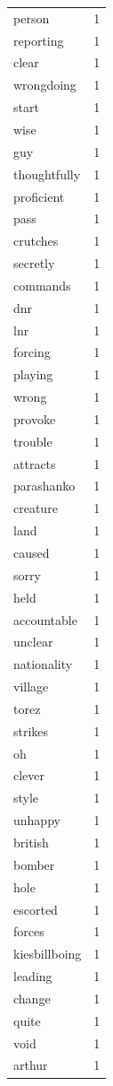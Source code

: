 \begin{tabular}{lr}
person & 1 \\
reporting & 1 \\
clear & 1 \\
wrongdoing & 1 \\
start & 1 \\
wise & 1 \\
guy & 1 \\
thoughtfully & 1 \\
proficient & 1 \\
pass & 1 \\
crutches & 1 \\
secretly & 1 \\
commands & 1 \\
dnr & 1 \\
lnr & 1 \\
forcing & 1 \\
playing & 1 \\
wrong & 1 \\
provoke & 1 \\
trouble & 1 \\
attracts & 1 \\
parashanko & 1 \\
creature & 1 \\
land & 1 \\
caused & 1 \\
sorry & 1 \\
held & 1 \\
accountable & 1 \\
unclear & 1 \\
nationality & 1 \\
village & 1 \\
torez & 1 \\
strikes & 1 \\
oh & 1 \\
clever & 1 \\
style & 1 \\
unhappy & 1 \\
british & 1 \\
bomber & 1 \\
hole & 1 \\
escorted & 1 \\
forces & 1 \\
kiesbillboing & 1 \\
leading & 1 \\
change & 1 \\
quite & 1 \\
void & 1 \\
arthur & 1 \\

\end{tabular}
